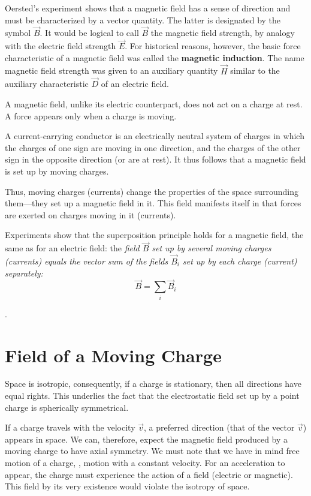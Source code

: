 Oersted's experiment shows that a magnetic field has a sense of direction and must be characterized by a vector quantity. The latter is designated by the symbol $\vec{B}$. It would be logical to call $\vec{B}$ the magnetic field strength, by analogy with the electric field strength $\vec{E}$. For historical reasons, however, the basic force characteristic of a magnetic field was called the \textbf{magnetic induction}. The name magnetic field strength was given to an auxiliary quantity $\vec{H}$ similar to the auxiliary characteristic $\vec{D}$ of an electric field.

A magnetic field, unlike its electric counterpart, does not act on a charge at rest. A force appears only when a charge is moving.

A current-carrying conductor is an electrically neutral system of charges in which the charges of one sign are moving in one direction, and the charges of the other sign in the opposite direction (or are at rest). It thus follows that a magnetic field is set up by moving charges.

Thus, moving charges (currents) change the properties of the space surrounding them---they set up a magnetic field in it. This field manifests itself in that forces are exerted on charges moving in it (currents).

Experiments show that the superposition principle holds for a magnetic field, the same as for an electric field: the \textit{field $\vec{B}$ set up
by several moving charges (currents) equals the vector sum of the fields $\vec{B}_i$ set up by each charge (current) separately:}
\begin{equation}\label{eq:6_16}
    \vec{B} = \sum_i \vec{B}_i
\end{equation}

.

\section{Field of a Moving Charge}\label{sec:6_3}

Space is isotropic, consequently, if a charge is stationary, then all directions have equal rights. This underlies the fact that the electrostatic field set up by a point charge is spherically symmetrical.

If a charge travels with the velocity $\vec{v}$, a preferred direction (that of the vector $\vec{v}$) appears in space. We can, therefore, expect the magnetic field produced by a moving charge to have axial symmetry. We must note that we have in mind free motion of a charge, \ie, motion with a constant velocity. For an acceleration to appear, the charge must experience the action of a field (electric or magnetic). This field by its very existence would violate the isotropy of space.

